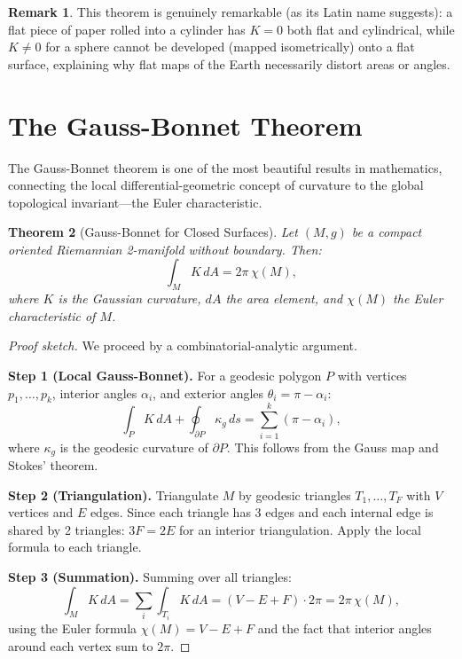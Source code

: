 \documentclass[12pt,a4paper]{amsart}
\newtheorem{theorem}{Theorem}[section]
\theoremstyle{definition}
\newtheorem{remark}[theorem]{Remark}
\begin{document}
\begin{remark}
This theorem is genuinely remarkable (as its Latin name suggests): a flat
piece of paper rolled into a cylinder has $K = 0$ both flat and cylindrical,
while $K \neq 0$ for a sphere cannot be developed (mapped isometrically)
onto a flat surface, explaining why flat maps of the Earth necessarily
distort areas or angles.
\end{remark}

\section{The Gauss-Bonnet Theorem}
\label{sec:gauss-bonnet}

The Gauss-Bonnet theorem is one of the most beautiful results in mathematics,
connecting the local differential-geometric concept of curvature to the global
topological invariant---the Euler characteristic.

\begin{theorem}[Gauss-Bonnet for Closed Surfaces]
\label{thm:gauss-bonnet}
Let $(M, g)$ be a compact oriented Riemannian 2-manifold without boundary.
Then:
\[
  \int_M K\,dA = 2\pi\,\chi(M),
\]
where $K$ is the Gaussian curvature, $dA$ the area element, and $\chi(M)$
the Euler characteristic of $M$.
\end{theorem}

\begin{proof}[Proof sketch]
We proceed by a combinatorial-analytic argument.

\textbf{Step 1 (Local Gauss-Bonnet).} For a geodesic polygon $P$ with
vertices $p_1, \ldots, p_k$, interior angles $\alpha_i$, and exterior angles
$\theta_i = \pi - \alpha_i$:
\[
  \int_P K\,dA + \oint_{\partial P} \kappa_g\,ds = \sum_{i=1}^k (\pi - \alpha_i),
\]
where $\kappa_g$ is the geodesic curvature of $\partial P$.
This follows from the Gauss map and Stokes' theorem.

\textbf{Step 2 (Triangulation).} Triangulate $M$ by geodesic triangles
$T_1, \ldots, T_F$ with $V$ vertices and $E$ edges. Since each triangle has
3 edges and each internal edge is shared by 2 triangles: $3F = 2E$ for an
interior triangulation. Apply the local formula to each triangle.

\textbf{Step 3 (Summation).} Summing over all triangles:
\[
  \int_M K\,dA = \sum_{i} \int_{T_i} K\,dA
  = (V - E + F) \cdot 2\pi = 2\pi\,\chi(M),
\]
using the Euler formula $\chi(M) = V - E + F$ and the fact that
interior angles around each vertex sum to $2\pi$.
\end{proof}
\end{document}
